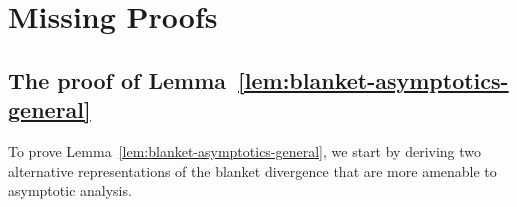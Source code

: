 \documentclass{article}
\theoremstyle{plain}
\theoremstyle{definition}
\begin{document}


\section{Missing Proofs}




\subsection{The proof of Lemma~\ref{lem:blanket-asymptotics-general}}
\label{app:proof-blanket-asymptotics-general}



\blanketasymptoticsgeneral*


To prove Lemma~\ref{lem:blanket-asymptotics-general}, we start by deriving two alternative representations of the blanket divergence that are more amenable to asymptotic analysis.
\end{document}

